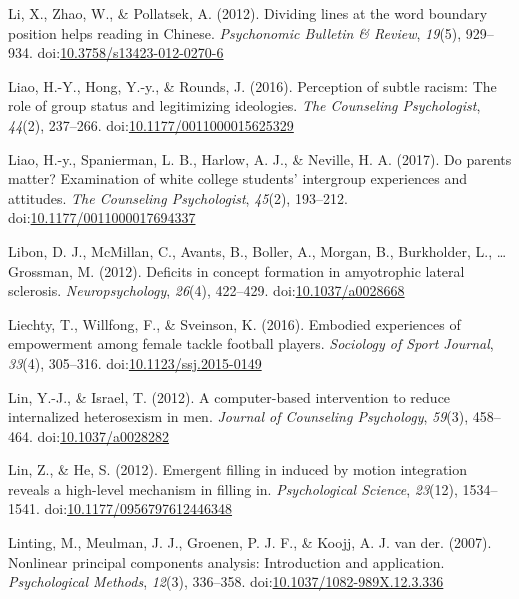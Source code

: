 \documentclass[english,man]{apa6}
\theoremstyle{definition}
\theoremstyle{definition}
\theoremstyle{definition}
\theoremstyle{remark}
\begin{document}
\hypertarget{ref-Li2012}{}
Li, X., Zhao, W., \& Pollatsek, A. (2012). Dividing lines at the word
boundary position helps reading in Chinese. \emph{Psychonomic Bulletin
\& Review}, \emph{19}(5), 929--934.
doi:\href{https://doi.org/10.3758/s13423-012-0270-6}{10.3758/s13423-012-0270-6}

\hypertarget{ref-Liao2016}{}
Liao, H.-Y., Hong, Y.-y., \& Rounds, J. (2016). Perception of subtle
racism: The role of group status and legitimizing ideologies. \emph{The
Counseling Psychologist}, \emph{44}(2), 237--266.
doi:\href{https://doi.org/10.1177/0011000015625329}{10.1177/0011000015625329}

\hypertarget{ref-Liao2017}{}
Liao, H.-y., Spanierman, L. B., Harlow, A. J., \& Neville, H. A. (2017).
Do parents matter? Examination of white college students' intergroup
experiences and attitudes. \emph{The Counseling Psychologist},
\emph{45}(2), 193--212.
doi:\href{https://doi.org/10.1177/0011000017694337}{10.1177/0011000017694337}

\hypertarget{ref-Libon2012}{}
Libon, D. J., McMillan, C., Avants, B., Boller, A., Morgan, B.,
Burkholder, L., \ldots{} Grossman, M. (2012). Deficits in concept
formation in amyotrophic lateral sclerosis. \emph{Neuropsychology},
\emph{26}(4), 422--429.
doi:\href{https://doi.org/10.1037/a0028668}{10.1037/a0028668}

\hypertarget{ref-Liechty2016}{}
Liechty, T., Willfong, F., \& Sveinson, K. (2016). Embodied experiences
of empowerment among female tackle football players. \emph{Sociology of
Sport Journal}, \emph{33}(4), 305--316.
doi:\href{https://doi.org/10.1123/ssj.2015-0149}{10.1123/ssj.2015-0149}

\hypertarget{ref-Lin2012}{}
Lin, Y.-J., \& Israel, T. (2012). A computer-based intervention to
reduce internalized heterosexism in men. \emph{Journal of Counseling
Psychology}, \emph{59}(3), 458--464.
doi:\href{https://doi.org/10.1037/a0028282}{10.1037/a0028282}

\hypertarget{ref-Lin2012a}{}
Lin, Z., \& He, S. (2012). Emergent filling in induced by motion
integration reveals a high-level mechanism in filling in.
\emph{Psychological Science}, \emph{23}(12), 1534--1541.
doi:\href{https://doi.org/10.1177/0956797612446348}{10.1177/0956797612446348}

\hypertarget{ref-Linting2007}{}
Linting, M., Meulman, J. J., Groenen, P. J. F., \& Koojj, A. J. van der.
(2007). Nonlinear principal components analysis: Introduction and
application. \emph{Psychological Methods}, \emph{12}(3), 336--358.
doi:\href{https://doi.org/10.1037/1082-989X.12.3.336}{10.1037/1082-989X.12.3.336}
\end{document}
